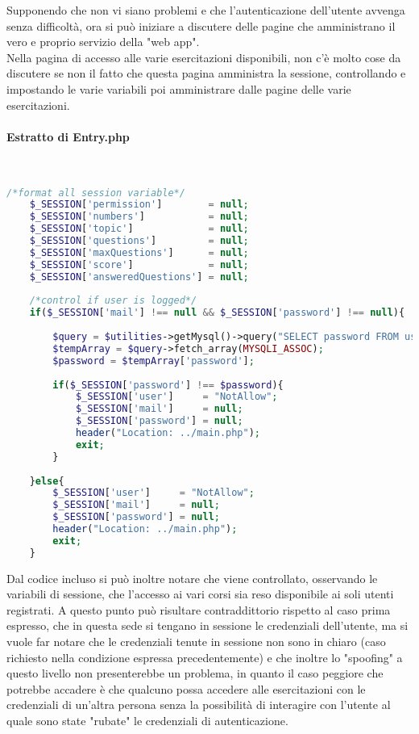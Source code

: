 Supponendo che non vi siano problemi e che l'autenticazione dell'utente avvenga senza difficoltà, ora si può iniziare a discutere delle pagine che amministrano il vero e proprio servizio della "web app".\\
Nella pagina di accesso alle varie esercitazioni disponibili, non c'è molto cose da discutere se non il fatto che questa pagina amministra la sessione, controllando e impostando le varie variabili poi amministrare dalle pagine delle varie esercitazioni. 

\paragraph{Estratto di Entry.php}\leavevmode\\

\begin{lstlisting}[language=php]
	/*format all session variable*/
	$_SESSION['permission']        = null;
	$_SESSION['numbers']           = null;
	$_SESSION['topic']             = null;
	$_SESSION['questions']         = null;
	$_SESSION['maxQuestions']      = null;
	$_SESSION['score']             = null;
	$_SESSION['answeredQuestions'] = null;
	
	/*control if user is logged*/
	if($_SESSION['mail'] !== null && $_SESSION['password'] !== null){
		
		$query = $utilities->getMysql()->query("SELECT password FROM user_table1 WHERE (email = '{$_SESSION['mail']}')");
		$tempArray = $query->fetch_array(MYSQLI_ASSOC);
		$password = $tempArray['password'];
		
		if($_SESSION['password'] !== $password){
			$_SESSION['user']     = "NotAllow";
			$_SESSION['mail']     = null;
			$_SESSION['password'] = null;
			header("Location: ../main.php");
			exit;
		}
		
	}else{
		$_SESSION['user']     = "NotAllow";
		$_SESSION['mail']     = null;
		$_SESSION['password'] = null;
		header("Location: ../main.php");
		exit;
	}
\end{lstlisting}
Dal codice incluso si può inoltre notare che viene controllato, osservando le variabili di sessione, che l'accesso ai vari corsi sia reso disponibile ai soli utenti registrati. A questo punto può risultare contraddittorio rispetto al caso prima espresso, che in questa sede si tengano in sessione le credenziali dell'utente, ma si vuole far notare che le credenziali tenute in sessione non sono in chiaro (caso richiesto nella condizione espressa precedentemente) e che inoltre lo "spoofing" a questo livello non presenterebbe un problema, in quanto il caso peggiore che potrebbe accadere è che qualcuno possa accedere alle esercitazioni con le  credenziali di un'altra persona senza la possibilità di interagire con l'utente al quale sono state "rubate" le credenziali di autenticazione.\\

